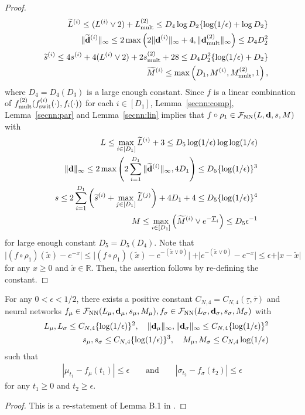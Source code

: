 \documentclass[twoside,11pt]{article}
\def\cF{\mathcal F}
\newcommand{\bd}{{\bf d}}
\newcommand{\bbR}{{\mathbb R}}
\newcommand{\bean}{\setlength\arraycolsep{1pt}\begin{eqnarray*}}
\newcommand{\eean}{\end{eqnarray*}}
\begin{document}
\begin{proof}
\bean
&& \widetilde L^{(i)} \leq (L^{(i)} \vee 2) + L_{\rm mult}^{(2)} \leq D_4 \log D_2  \{ \log (1/\epsilon) + \log D_2 \} 
\\
&& \| \widetilde \bd^{(i)} \|_{\infty} \leq 2\max \left( 2\|\bd^{(i)}\|_{\infty} + 4 ,  \|\bd_{\rm mult}^{(2)}\|_{\infty}   \right) \leq D_4 D_2^2
\\
&& \widetilde s^{(i)} \leq 4 s^{(i)} + 4 (L^{(i)} \vee 2) + 2 s_{\rm mult}^{(2)} + 28  \leq D_4 D_2^{2}  \{ \log (1/\epsilon) +  D_2 \} 
\\
&& \widetilde M^{(i)} \leq \max\left(D_1, M^{(i)}, M_{\rm mult}^{(2)}, 1 \right),
\eean
where $D_4 = D_4(D_3)$ is a large enough constant.
Since $f$ is a linear combination of $f_{\rm mult}^{(2)}(f_{\rm swit}^{(i)}(\cdot) , f_{i}(\cdot))$ for each $i \in [D_1]$, Lemma~\ref{secnn:comp}, Lemma~\ref{secnn:par} and Lemma~\ref{secnn:lin} implies that $f \circ \rho_{1} \in \cF_{\rm NN}(L,\bd,s,M)$ with
\bean
&& L \leq \max_{i \in [D_1]} \widetilde L^{(i)} + 3 \leq D_5 \log(1/\epsilon) \log \log (1/\epsilon)
\\
&& \|\bd\|_{\infty} \leq 2\max\left( 2\sum_{i=1}^{D_1} \| \widetilde \bd^{(i)}\|_{\infty}, 4 D_1 \right) \leq D_5  \{ \log(1/\epsilon)\}^{3}
\\
&& s \leq 2\sum_{i=1}^{D_1}\left(\widetilde s^{(i)} +  \max_{j \in [D_1]} \widetilde L^{(j)} \right) + 4D_1 + 4 \leq D_5  \{ \log(1/\epsilon)\}^{4}
\\
&& M \leq \max_{i \in [D_1]} \left(\widetilde M^{(i)} \vee e^{-\underline{T}_i} \right) \leq D_5 \epsilon^{-1}
\eean
for large enough constant $D_5 = D_5(D_4)$.
Note that $\vert(f \circ \rho_{1})(\widetilde x) - e^{-x} \vert \leq \vert(f \circ \rho_{1})(\widetilde x) - e^{-(\widetilde x \vee 0)} \vert \ + \vert e^{-(\widetilde x \vee 0)} - e^{-x} \vert \leq \epsilon + \vert x-\widetilde x\vert$ for any $x \geq 0$ and $\widetilde x \in \bbR$.
Then, the assertion follows by re-defining the constant.
\end{proof}



\begin{lemma}
\label{secnn:mtst}
For any $0 < \epsilon < 1/2$, there exists a positive constant $C_{N,4} = C_{N,4}(\underline{\tau},\overline{\tau})$ and neural networks $f_{\mu} \in \cF_{\rm NN}(L_{\mu},\bd_{\mu},s_{\mu},M_{\mu}), f_{\sigma} \in \cF_{\rm NN}(L_{\sigma},\bd_{\sigma},s_{\sigma},M_{\sigma})$ with
\bean
&& L_{\mu}, L_{\sigma} \leq C_{N,4} \{ \log(1/\epsilon)\}^{2}, \quad \|\bd_{\mu} \|_{\infty},  \| \bd_{\sigma}\|_{\infty} \leq C_{N,4}  \{ \log(1/\epsilon)\}^{2}
\\
&& s_{\mu}, s_{\sigma} \leq C_{N,4}  \{ \log(1/\epsilon)\}^{3}, \quad M_{\mu}, M_{\sigma} \leq C_{N,4} \log ( 1/\epsilon)
\eean
such that
\bean
\left\vert \mu_{t_1} - f_{\mu}(t_1) \right\vert \leq \epsilon \quad \quad \text{and} \quad \quad \left\vert \sigma_{t_2} - f_{\sigma}(t_2) \right\vert \leq \epsilon 
\eean
for any $t_1 \geq 0$ and $t_2 \geq \epsilon$.
\end{lemma}
\begin{proof}
This is a re-statement of Lemma B.1 in \citet{oko2023diffusion}.
\end{proof}
\end{document}
